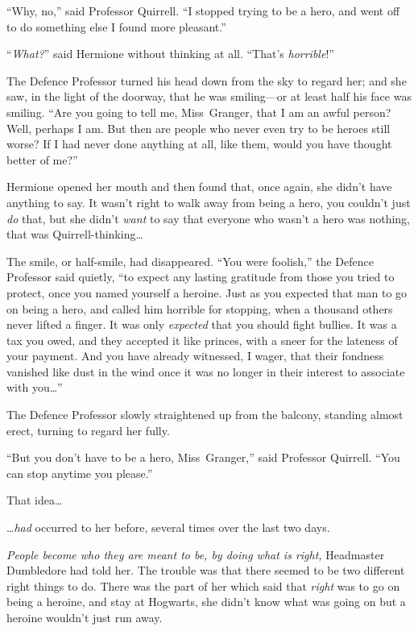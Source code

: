 “Why, no,” said Professor Quirrell. “I stopped trying to be a hero, and went off to do something else I found more pleasant.”

“\emph{What?}” said Hermione without thinking at all. “That’s \emph{horrible}!”

The Defence Professor turned his head down from the sky to regard her; and she saw, in the light of the doorway, that he was smiling—or at least half his face was smiling. “Are you going to tell me, Miss~Granger, that I am an awful person? Well, perhaps I am. But then are people who never even try to be heroes still worse? If I had never done anything at all, like them, would you have thought better of me?”

Hermione opened her mouth and then found that, once again, she didn’t have anything to say. It wasn’t right to walk away from being a hero, you couldn’t just \emph{do} that, but she didn’t \emph{want} to say that everyone who wasn’t a hero was nothing, that was Quirrell-thinking…

The smile, or half-smile, had disappeared. “You were foolish,” the Defence Professor said quietly, “to expect any lasting gratitude from those you tried to protect, once you named yourself a heroine. Just as you expected that man to go on being a hero, and called him horrible for stopping, when a thousand others never lifted a finger. It was only \emph{expected} that you should fight bullies. It was a tax you owed, and they accepted it like princes, with a sneer for the lateness of your payment. And you have already witnessed, I wager, that their fondness vanished like dust in the wind once it was no longer in their interest to associate with you…”

The Defence Professor slowly straightened up from the balcony, standing almost erect, turning to regard her fully.

“But you don’t have to be a hero, Miss~Granger,” said Professor Quirrell. “You can stop anytime you please.”

That idea…

…\emph{had} occurred to her before, several times over the last two days.

\emph{People become who they are meant to be, by doing what is right,} Headmaster Dumbledore had told her. The trouble was that there seemed to be two different right things to do. There was the part of her which said that \emph{right} was to go on being a heroine, and stay at Hogwarts, she didn’t know what was going on but a heroine wouldn’t just run away.

